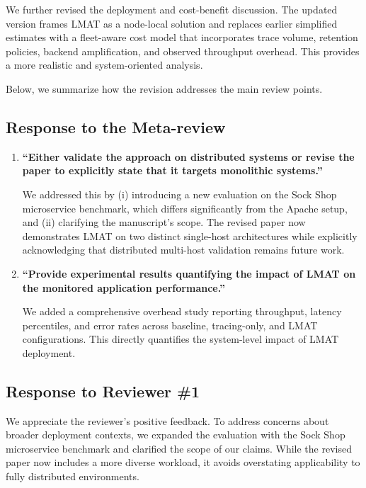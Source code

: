 \documentclass[11pt]{article}
\begin{document}
We further revised the deployment and cost-benefit discussion. The updated version frames LMAT as a node-local solution and replaces earlier simplified estimates with a fleet-aware cost model that incorporates trace volume, retention policies, backend amplification, and observed throughput overhead. This provides a more realistic and system-oriented analysis.

Below, we summarize how the revision addresses the main review points.


\subsection*{Response to the Meta-review}

\begin{enumerate}[leftmargin=1.5em]

\item \textbf{``Either validate the approach on distributed systems or revise the paper to explicitly state that it targets monolithic systems.''}

We addressed this by (i) introducing a new evaluation on the Sock Shop microservice benchmark, which differs significantly from the Apache setup, and (ii) clarifying the manuscript’s scope. The revised paper now demonstrates LMAT on two distinct single-host architectures while explicitly acknowledging that distributed multi-host validation remains future work.

\item \textbf{``Provide experimental results quantifying the impact of LMAT on the monitored application performance.''}

We added a comprehensive overhead study reporting throughput, latency percentiles, and error rates across baseline, tracing-only, and LMAT configurations. This directly quantifies the system-level impact of LMAT deployment.

\end{enumerate}

\subsection*{Response to Reviewer \#1}

We appreciate the reviewer’s positive feedback. To address concerns about broader deployment contexts, we expanded the evaluation with the Sock Shop microservice benchmark and clarified the scope of our claims. While the revised paper now includes a more diverse workload, it avoids overstating applicability to fully distributed environments.
\end{document}
